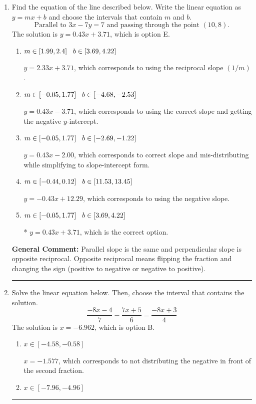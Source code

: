 \documentclass{extbook}[14pt]
\newcommand{\litem}[1]{\item #1

\rule{\textwidth}{0.4pt}}
\begin{document}
\begin{enumerate}\litem{
Find the equation of the line described below. Write the linear equation as $ y=mx+b $ and choose the intervals that contain $m$ and $b$.
\[ \text{Parallel to } 3 x - 7 y = 7 \text{ and passing through the point } (10, 8). \]The solution is \( y = 0.43x + 3.71 \), which is option E.\begin{enumerate}[label=\Alph*.]
\item \( m \in [1.99, 2.4] \hspace*{3mm} b \in [3.69, 4.22] \)

 $y = 2.33x + 3.71$, which corresponds to using the reciprocal slope $(1/m)$.
\item \( m \in [-0.05, 1.77] \hspace*{3mm} b \in [-4.68, -2.53] \)

 $y = 0.43x - 3.71$, which corresponds to using the correct slope and getting the negative $y$-intercept.
\item \( m \in [-0.05, 1.77] \hspace*{3mm} b \in [-2.69, -1.22] \)

 $y = 0.43x - 2.00$, which corresponds to correct slope and mis-distributing while simplifying to slope-intercept form.
\item \( m \in [-0.44, 0.12] \hspace*{3mm} b \in [11.53, 13.45] \)

 $y = -0.43x + 12.29$, which corresponds to using the negative slope.
\item \( m \in [-0.05, 1.77] \hspace*{3mm} b \in [3.69, 4.22] \)

* $y = 0.43x + 3.71$, which is the correct option.
\end{enumerate}

\textbf{General Comment:} Parallel slope is the same and perpendicular slope is opposite reciprocal. Opposite reciprocal means flipping the fraction and changing the sign (positive to negative or negative to positive).
}
\litem{
Solve the linear equation below. Then, choose the interval that contains the solution.
\[ \frac{-8x -4}{7} - \frac{7x + 5}{6} = \frac{-8x + 3}{4} \]The solution is \( x = -6.962 \), which is option B.\begin{enumerate}[label=\Alph*.]
\item \( x \in [-4.58, -0.58] \)

 $x = -1.577$, which corresponds to not distributing the negative in front of the second fraction.
\item \( x \in [-7.96, -4.96] \)


\end{enumerate}}
\end{enumerate}
\end{document}
